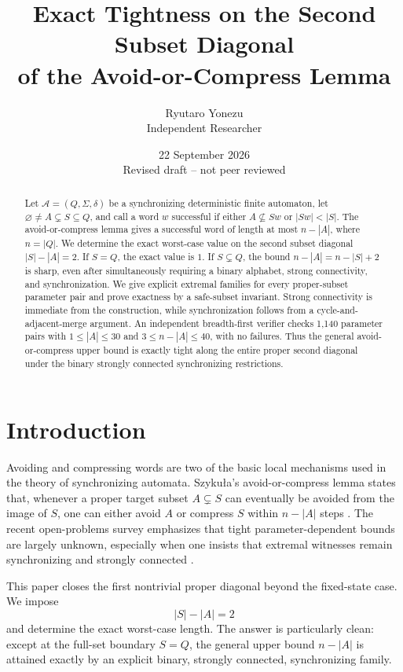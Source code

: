 \documentclass[11pt]{article}
\title{Exact Tightness on the Second Subset Diagonal\\of the Avoid-or-Compress Lemma}
\author{Ryutaro Yonezu\\Independent Researcher}
\date{22 September 2026\\Revised draft -- not peer reviewed}
\theoremstyle{definition}
\theoremstyle{remark}
\newcommand{\Acal}{\mathcal A}
\begin{document}
\maketitle

\begin{abstract}
Let $\Acal=(Q,\Sigma,\delta)$ be a synchronizing deterministic finite automaton, let $\varnothing\ne A\subsetneq S\subseteq Q$, and call a word $w$ successful if either $A\nsubseteq S w$ or $|S w|<|S|$. The avoid-or-compress lemma gives a successful word of length at most $n-|A|$, where $n=|Q|$. We determine the exact worst-case value on the second subset diagonal $|S|-|A|=2$. If $S=Q$, the exact value is $1$. If $S\subsetneq Q$, the bound $n-|A|=n-|S|+2$ is sharp, even after simultaneously requiring a binary alphabet, strong connectivity, and synchronization. We give explicit extremal families for every proper-subset parameter pair and prove exactness by a safe-subset invariant. Strong connectivity is immediate from the construction, while synchronization follows from a cycle-and-adjacent-merge argument. An independent breadth-first verifier checks 1,140 parameter pairs with $1\le |A|\le30$ and $3\le n-|A|\le40$, with no failures. Thus the general avoid-or-compress upper bound is exactly tight along the entire proper second diagonal under the binary strongly connected synchronizing restrictions.
\end{abstract}

\section{Introduction}
Avoiding and compressing words are two of the basic local mechanisms used in the theory of synchronizing automata. Szyku\l a's avoid-or-compress lemma states that, whenever a proper target subset $A\subsetneq S$ can eventually be avoided from the image of $S$, one can either avoid $A$ or compress $S$ within $n-|A|$ steps \cite{Szykula2018,Szykula2026}. The recent open-problems survey emphasizes that tight parameter-dependent bounds are largely unknown, especially when one insists that extremal witnesses remain synchronizing and strongly connected \cite{Szykula2026}.

This paper closes the first nontrivial proper diagonal beyond the fixed-state case. We impose
\[
|S|-|A|=2
\]
and determine the exact worst-case length. The answer is particularly clean: except at the full-set boundary $S=Q$, the general upper bound $n-|A|$ is attained exactly by an explicit binary, strongly connected, synchronizing family.
\end{document}

